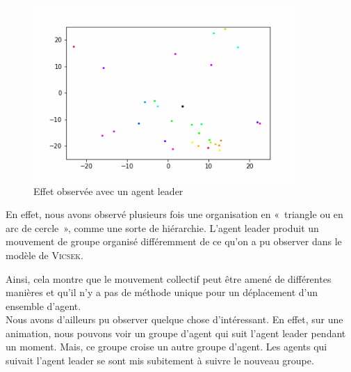 \documentclass[french, a4paper, 12pt, openany]{report}
\begin{document}
       	
   \begin{figure}[!h]
		\centering
		\includegraphics[width=10cm]{images/image_15.png}
		\caption{Effet observée avec un agent leader}
		\label{leader}
	\end{figure}  
	
	   En effet, nous avons observé plusieurs fois une organisation en «~triangle ou en arc de cercle~», comme une sorte de hiérarchie. L'agent leader produit un mouvement de groupe organisé différemment de ce qu'on a pu observer dans le modèle de \textsc{Vicsek}.
	   
	   Ainsi, cela montre que le mouvement collectif peut être amené de différentes manières et qu'il n'y a pas de méthode unique pour un déplacement d'un ensemble d'agent.\\
    
  
       Nous avons d'ailleurs pu observer quelque chose d'intéressant. En effet, sur une animation, nous pouvons voir un groupe d'agent qui suit l'agent leader pendant un moment. Mais, ce groupe croise un autre groupe d'agent. Les agents qui suivait l'agent leader se sont mis subitement à suivre le nouveau groupe. 
       
\end{document}

